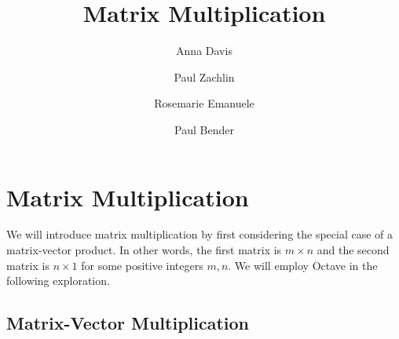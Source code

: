 \documentclass{ximera}
\author{Anna Davis\and Paul Zachlin  \and Rosemarie Emanuele \and Paul Bender} \title{Matrix Multiplication} \license{CC-BY 4.0}
\begin{document}
\begin{abstract}

\end{abstract}
\maketitle

\section*{Matrix Multiplication}

We will introduce matrix multiplication by first considering the special case of a matrix-vector product.  In other words, the first matrix is $m \times n$ and the second matrix is $n \times 1$ for some positive integers $m,n$.  We will employ Octave in the following exploration.

\subsection*{Matrix-Vector Multiplication}
\end{document}
